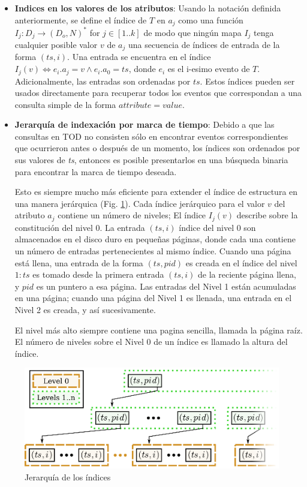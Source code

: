 \documentclass[12pt,legalpaper]{report}
\begin{document}
\begin{itemize}
	\item \textbf{Indices en los valores de los atributos}: Usando la notación definida anteriormente, se define el índice de $T$ en $a_j$ como una función $I_j: D_j \rightarrow (D_o,N)^*$ for $j \in [1..k]$ de modo que ningún mapa $I_j$ tenga cualquier posible valor $v$ de $a_j$ una secuencia de índices de entrada de la forma $(ts,i)$.  Una entrada se encuentra en el índice $I_j(v) \Leftrightarrow e_i.a_j = v \wedge e_i.a_0 = ts$, donde $e_i$ es el i-esimo evento de $T$.  Adicionalmente, las entradas son ordenadas por $ts$.  Estos índices pueden ser usados directamente para recuperar todos los eventos que correspondan a una consulta simple de la forma $attribute = value$.
	
	\item \textbf{Jerarquía de indexación por marca de tiempo}: Debido a que las consultas en TOD no consisten sólo en encontrar eventos correspondientes que ocurrieron antes o después de un momento, los índices son ordenados por sus valores de \textit{ts}, entonces es posible presentarlos en una búsqueda binaria para encontrar la marca de tiempo deseada.

Esto es siempre mucho más eficiente para extender el índice de estructura en una manera jerárquica (Fig. \ref{hierarchicalIndexes}).  Cada índice jerárquico para el valor $v$ del atributo $a_j$ contiene un número de niveles;  El índice $I_j(v)$ describe sobre la constitución del nivel 0.  La entrada $(ts, i)$ índice del nivel 0 son almacenados en el disco duro en pequeñas páginas, donde cada una contiene un número de entradas pertenecientes al mismo índice.  Cuando una página está llena, una entrada de la forma $(ts,pid)$ es creada en el índice del nivel $1: ts$ es tomado desde la primera entrada $(ts,i)$ de la reciente página llena, y $pid$ es un puntero a esa página.  Las entradas del Nivel 1 están acumuladas en una página; cuando una página del Nivel 1 es llenada, una entrada en el Nivel 2 es creada, y así sucesivamente.  

El nivel más alto siempre contiene una pagina sencilla, llamada la página raíz.  El número de niveles sobre el Nivel 0 de un índice es llamado la altura del índice.  
\end{itemize}


\begin{figure}[hpb]
	\centering
	\includegraphics[scale=0.8]{images/TOD/hierarchicalIndexes.eps}
	\caption{Jerarquía de los índices}
	\label{hierarchicalIndexes}
\end{figure}
\end{document}
